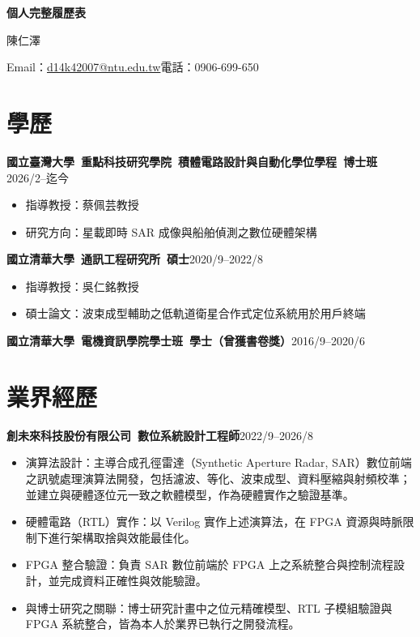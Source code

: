 \documentclass[11pt,fontset=none]{ctexart}
\newcommand{\entry}[2]{\noindent\textbf{#1}\hfill #2\par}
\begin{document}
\begin{center}
  {\Large\bfseries 個人完整履歷表\par}
  \vspace{4pt}
  {\large 陳仁澤\par}
  \vspace{2pt}
  Email：\href{mailto:d14k42007@ntu.edu.tw}{d14k42007@ntu.edu.tw}\quad 電話：0906-699-650
\end{center}

\section{學歷}

\entry{國立臺灣大學\ 重點科技研究學院\ 積體電路設計與自動化學位學程\ 博士班}{2026/2--迄今}
\begin{itemize}
  \item 指導教授：蔡佩芸教授
  \item 研究方向：星載即時 SAR 成像與船舶偵測之數位硬體架構
\end{itemize}
\entry{國立清華大學\ 通訊工程研究所\ 碩士}{2020/9--2022/8}
\begin{itemize}
  \item 指導教授：吳仁銘教授
  \item 碩士論文：波束成型輔助之低軌道衛星合作式定位系統用於用戶終端
\end{itemize}
\entry{國立清華大學\ 電機資訊學院學士班\ 學士（曾獲書卷獎）}{2016/9--2020/6}

\section{業界經歷}

\entry{創未來科技股份有限公司\ 數位系統設計工程師}{2022/9--2026/8}
\begin{itemize}
  \item 演算法設計：主導合成孔徑雷達（Synthetic Aperture Radar, SAR）數位前端之訊號處理演算法開發，包括濾波、等化、波束成型、資料壓縮與射頻校準；並建立與硬體逐位元一致之軟體模型，作為硬體實作之驗證基準。
  \item 硬體電路（RTL）實作：以 Verilog 實作上述演算法，在 FPGA 資源與時脈限制下進行架構取捨與效能最佳化。
  \item FPGA 整合驗證：負責 SAR 數位前端於 FPGA 上之系統整合與控制流程設計，並完成資料正確性與效能驗證。
  \item 與博士研究之關聯：博士研究計畫中之位元精確模型、RTL 子模組驗證與 FPGA 系統整合，皆為本人於業界已執行之開發流程。
\end{itemize}
\end{document}
